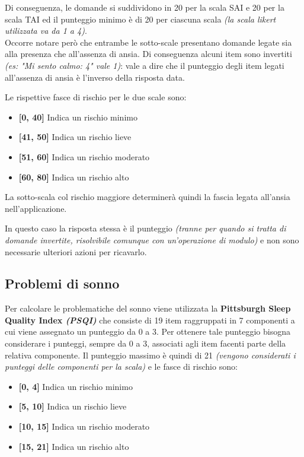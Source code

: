 Di conseguenza, le domande si suddividono in 20 per la scala SAI e 20 per la scala TAI ed il punteggio minimo è di 20 per ciascuna scala \textit{(la scala likert utilizzata va da 1 a 4)}.\\
Occorre notare però che entrambe le sotto-scale presentano domande legate sia alla presenza che all'assenza di ansia. Di conseguenza alcuni item sono invertiti \textit{(es: "Mi sento calmo: 4" vale 1)}: vale a dire che il punteggio degli item legati all'assenza di ansia è l'inverso della risposta data.

Le rispettive fasce di rischio per le due scale sono:
\begin{itemize}
\item \textbf{[0, 40]} Indica un rischio minimo
\item \textbf{[41, 50]} Indica un rischio lieve
\item \textbf{[51, 60]} Indica un rischio moderato
\item \textbf{[60, 80]} Indica un rischio alto
\end{itemize}

La sotto-scala col rischio maggiore determinerà quindi la fascia legata all'ansia nell'applicazione.

In questo caso la risposta stessa è il punteggio \textit{(tranne per quando si tratta di domande invertite, risolvibile comunque con un'operazione di modulo)} e non sono necessarie ulteriori azioni per ricavarlo.

\newpage
\subsection{Problemi di sonno}
Per calcolare le problematiche del sonno viene utilizzata la \textbf{Pittsburgh Sleep Quality Index \textit{(PSQI)}}\cite{PSQI} che consiste di 19 item raggruppati in 7 componenti a cui viene assegnato un punteggio da 0 a 3. Per ottenere tale punteggio bisogna considerare i punteggi, sempre da 0 a 3, associati agli item facenti parte della relativa componente. Il punteggio massimo è quindi di 21 \textit{(vengono considerati i punteggi delle componenti per la scala)} e le fasce di rischio sono:
\begin{itemize}
\item \textbf{[0, 4]} Indica un rischio minimo
\item \textbf{[5, 10]} Indica un rischio lieve
\item \textbf{[10, 15]} Indica un rischio moderato
\item \textbf{[15, 21]} Indica un rischio alto
\end{itemize}

